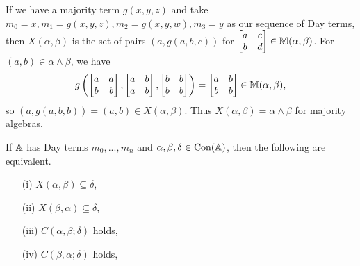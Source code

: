 \begin{appendices}
\begin{ex} If we have a majority term $g(x,y,z)$ and take $m_0 = x, m_1 = g(x,y,z), m_2 = g(x,y,w), m_3 = y$ as our sequence of Day terms, then $X(\alpha,\beta)$ is the set of pairs $(a,g(a,b,c))$ for $\begin{bmatrix} a & c\\ b & d\end{bmatrix} \in \mathbb{M}(\alpha,\beta)$. For $(a,b) \in \alpha\wedge\beta$, we have
\[
g\left(\begin{bmatrix} a & a\\ b & b\end{bmatrix}, \begin{bmatrix} a & b\\ a & b\end{bmatrix}, \begin{bmatrix} b & b\\ b & b\end{bmatrix}\right) = \begin{bmatrix} a & b\\ b & b\end{bmatrix} \in \mathbb{M}(\alpha,\beta),
\]
so $(a,g(a,b,b)) = (a,b) \in X(\alpha,\beta)$. Thus $X(\alpha,\beta) = \alpha\wedge\beta$ for majority algebras.
\end{ex}

\begin{thm}\label{day-commutator} If $\mathbb{A}$ has Day terms $m_0, ..., m_n$ and $\alpha,\beta,\delta \in \operatorname{Con}(\mathbb{A})$, then the following are equivalent.
\begin{itemize}
\item[(i)] $X(\alpha,\beta) \subseteq \delta$,

\item[(ii)] $X(\beta,\alpha) \subseteq \delta$,

\item[(iii)] $C(\alpha,\beta;\delta)$ holds,

\item[(iv)] $C(\beta,\alpha;\delta)$ holds,


\end{itemize}
\end{thm}
\end{appendices}

